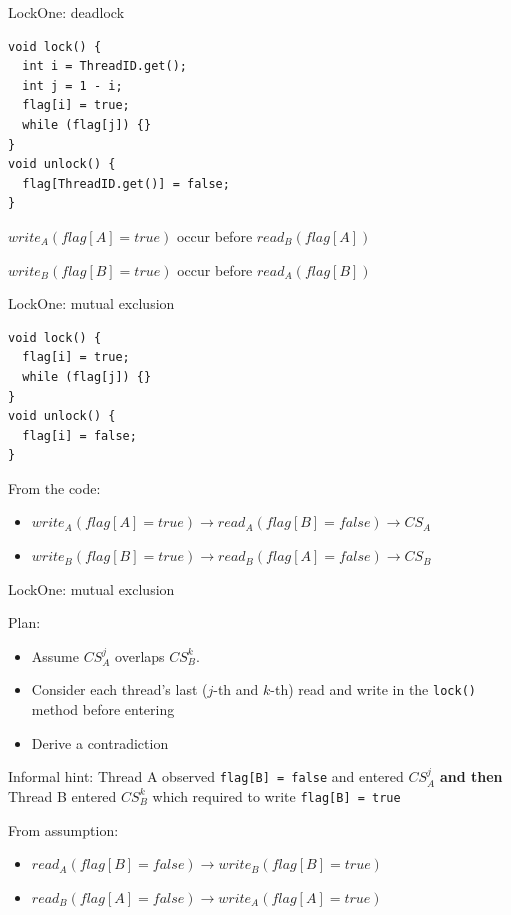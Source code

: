 \begin{frame}[fragile]{LockOne: deadlock}

\begin{verbatim}
void lock() {
  int i = ThreadID.get();
  int j = 1 - i;
  flag[i] = true;
  while (flag[j]) {}
}
void unlock() {
  flag[ThreadID.get()] = false;
}
\end{verbatim}

$write_{A}(flag[A] = true)$ occur before $read_{B}(flag[A])$

$write_{B}(flag[B] = true)$ occur before $read_{A}(flag[B])$
\end{frame}


\begin{frame}[fragile]{LockOne: mutual exclusion}
\begin{verbatim}
void lock() {
  flag[i] = true;
  while (flag[j]) {}
}
void unlock() {
  flag[i] = false;
}
\end{verbatim}

From the code:
\begin{itemize}
  \item $write_{A}(flag[A] = true) \rightarrow read_{A}(flag[B] = false) \rightarrow CS_{A}$ 
  \item $write_{B}(flag[B] = true) \rightarrow read_{B}(flag[A] = false) \rightarrow CS_{B}$ 
\end{itemize}

\end{frame}


\begin{frame}[fragile]{LockOne: mutual exclusion}

Plan:
\begin{itemize}
  \item Assume $CS_A^j$ overlaps $CS_B^k$.
  \item Consider each thread's last ($j$-th and $k$-th) read and write in the \texttt{lock()} method before entering 
  \item Derive a contradiction
\end{itemize}

\pause
Informal hint: Thread A observed \texttt{flag[B] = false} and entered $CS_A^j$ \textbf{and then} Thread B entered $CS_B^k$ which required to write \texttt{flag[B] = true}

\pause
From assumption:
\begin{itemize}
  \item $read_{A}(flag[B] = false) \rightarrow write_{B}(flag[B] = true)$ 
  \item $read_{B}(flag[A] = false) \rightarrow write_{A}(flag[A] = true)$ 
\end{itemize}

\end{frame}

